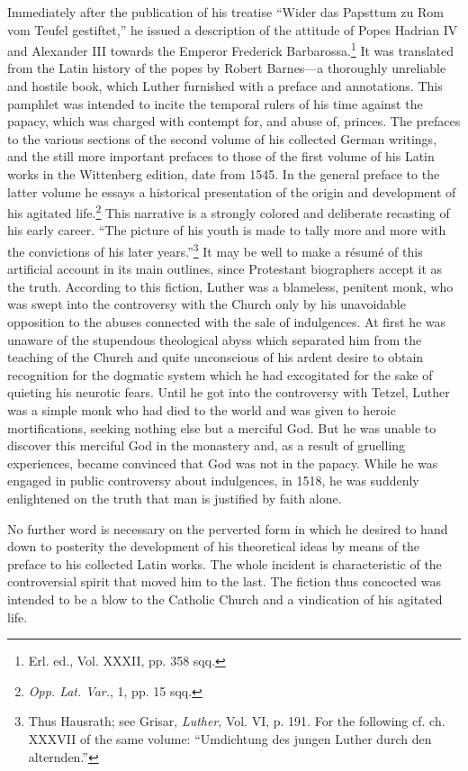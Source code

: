 Immediately after the publication of his treatise “Wider das Papsttum
zu Rom vom Teufel gestiftet,” he issued a description of the
attitude of Popes Hadrian IV and Alexander III towards
the Emperor Frederick Barbarossa.\footnote{Erl. ed., Vol. XXXII, pp. 358 sqq.}
 It was translated from the Latin history
of the popes by Robert Barnes—a thoroughly unreliable and hostile
book, which Luther furnished with a preface and annotations. This
pamphlet was intended to incite the temporal rulers of his time
against the papacy, which was charged with contempt for, and abuse
of, princes. The prefaces to the various sections of the second volume
of his collected German writings, and the still more important prefaces
to those of the first volume of his Latin works in the
Wittenberg edition, date from 1545. In the general preface to the latter
volume he essays a historical presentation of the origin and development
of his agitated life.\footnote{\textit{Opp. Lat. Var.}, 1, pp. 15 sqq.}
 This narrative is a strongly colored and
deliberate recasting of his early career. “The picture of his youth
is made to tally more and more with the convictions of his later
years.”\footnote
{Thus Hausrath; see Grisar, \textit{Luther}, Vol. VI, p. 191. For the following cf. ch. XXXVII
of the same volume: “Umdichtung des jungen Luther durch den alternden.”}
It may be well to make a résumé of this artificial account
in its main outlines, since Protestant biographers accept it as the
truth. According to this fiction, Luther was a blameless, penitent
monk, who was swept into the controversy with the Church only
by his unavoidable opposition to the abuses connected with the sale
of indulgences. At first he was unaware of the stupendous theological
abyss which separated him from the teaching of the Church and quite
unconscious of his ardent desire to obtain recognition for the dogmatic
system which he had excogitated for the sake of quieting his
neurotic fears. Until he got into the controversy with Tetzel, Luther
was a simple monk who had died to the world and was given to heroic
mortifications, seeking nothing else but a merciful God. But he was
unable to discover this merciful God in the monastery and, as a result
of gruelling experiences, became convinced that God was not
in the papacy. While he was engaged in public controversy about indulgences,
in 1518, he was suddenly enlightened on the truth that man
is justified by faith alone.

No further word is necessary on the perverted form in which he
desired to hand down to posterity the development of his theoretical
ideas by means of the preface to his collected Latin works. The whole
incident is characteristic of the controversial spirit that moved him
to the last. The fiction thus concocted was intended to be a blow to
the Catholic Church and a vindication of his agitated life.

